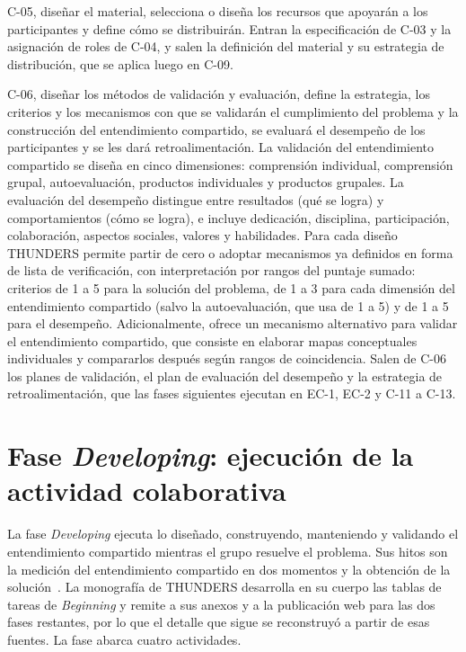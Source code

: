 \documentclass[12pt,letterpaper,oneside]{report}
\begin{document}
C-05, diseñar el material, selecciona o diseña los recursos que apoyarán a los
participantes y define cómo se distribuirán. Entran la especificación de C-03 y
la asignación de roles de C-04, y salen la definición del material y su
estrategia de distribución, que se aplica luego en C-09.

C-06, diseñar los métodos de validación y evaluación, define la estrategia, los
criterios y los mecanismos con que se validarán el cumplimiento del problema y
la construcción del entendimiento compartido, se evaluará el desempeño de los
participantes y se les dará retroalimentación. La validación del entendimiento
compartido se diseña en cinco dimensiones: comprensión individual, comprensión
grupal, autoevaluación, productos individuales y productos grupales. La
evaluación del desempeño distingue entre resultados (qué se logra) y
comportamientos (cómo se logra), e incluye dedicación, disciplina,
participación, colaboración, aspectos sociales, valores y habilidades. Para
cada diseño THUNDERS permite partir de cero o adoptar mecanismos ya definidos
en forma de lista de verificación, con interpretación por rangos del puntaje
sumado: criterios de 1 a 5 para la solución del problema, de 1 a 3 para cada
dimensión del entendimiento compartido (salvo la autoevaluación, que usa de 1 a 5) y de 1
a 5 para el desempeño. Adicionalmente, ofrece un mecanismo alternativo para
validar el entendimiento compartido, que consiste en elaborar mapas conceptuales
individuales y compararlos después según rangos de coincidencia. Salen de C-06
los planes de validación, el plan de evaluación del desempeño y la estrategia
de retroalimentación, que las fases siguientes ejecutan en EC-1, EC-2 y C-11 a
C-13.

\section{Fase \textit{Developing}: ejecución de la actividad colaborativa}
\label{sec:base_developing}
La fase \textit{Developing} ejecuta lo diseñado, construyendo, manteniendo y
validando el entendimiento compartido mientras el grupo resuelve el problema.
Sus hitos son la medición del entendimiento compartido en dos momentos y la
obtención de la solución~\cite{agredo2022thesis}. La monografía de THUNDERS
desarrolla en su cuerpo las tablas de tareas de \textit{Beginning} y remite a
sus anexos y a la publicación web para las dos fases restantes, por lo que el
detalle que sigue se reconstruyó a partir de esas fuentes. La fase abarca
cuatro actividades.
\end{document}

